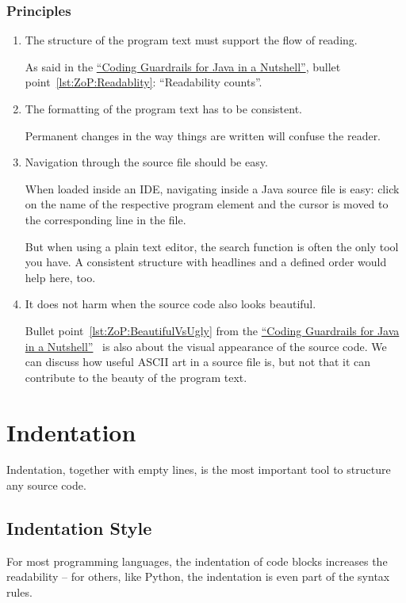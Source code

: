 \documentclass[11pt,a4paper, titlepage, parskip=half, headsepline, footsepline, cleardoublepage=current, headheight=1cm]{scrbook}
\newcommand*{\ngref}{\hyperref[lst:NutshellGuardrails]{“Coding Guardrails for Java in a Nutshell”}}
\begin{document}
\subsubsection{Principles}
\begin{enumerate}[label=P\arabic*.]
	\item{The structure of the program text must support the flow of reading.
	
	As said in the \ngref, bullet point~\ref{lst:ZoP:Readablity}: “Readability counts”.}
	
	\item{The formatting of the program text has to be consistent.
	
	Permanent changes in the way things are written will confuse the reader.}
	
	\item{Navigation through the source file should be easy.
	
	When loaded inside an IDE, navigating inside a Java source file is easy: click on the name of the respective program element and the cursor is moved to the corresponding line in the file.
	
	But when using a plain text editor, the search function is often the only tool you have. A consistent structure with headlines and a defined order would help here, too.}
	
	\item{It does not harm when the source code also looks beautiful.
	
	Bullet point~\ref{lst:ZoP:BeautifulVsUgly} from the \ngref~ is also about the visual appearance of the source code. We can discuss how useful ASCII art in a source file is, but not that it can contribute to the beauty of the program text.}
\end{enumerate}

\section{Indentation}\label{sec:Indentation}
Indentation, together with empty lines, is the most important tool to structure any source code.

\subsection{Indentation Style}\label{sec:IndentationStyle}
For most programming languages, the indentation of code blocks increases the readability – for others, like Python\autocite{W3SCHOOLS:PythonIndentation}, the indentation is even part of the syntax rules.
\end{document}
